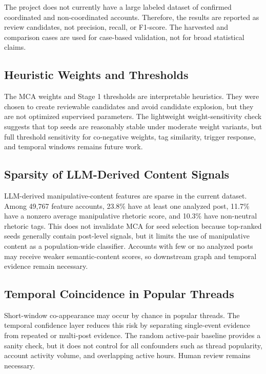 \documentclass[conference]{IEEEtran}
\begin{document}
The project does not currently have a large labeled dataset of confirmed
coordinated and non-coordinated accounts. Therefore, the results are reported
as review candidates, not precision, recall, or F1-score. The harvested and
comparison cases are used for case-based validation, not for broad statistical
claims.

\subsection{Heuristic Weights and Thresholds}

The MCA weights and Stage 1 thresholds are interpretable heuristics. They were
chosen to create reviewable candidates and avoid candidate explosion, but they
are not optimized supervised parameters. The lightweight weight-sensitivity
check suggests that top seeds are reasonably stable under moderate weight
variants, but full threshold sensitivity for co-negative weights, tag
similarity, trigger response, and temporal windows remains future work.

\subsection{Sparsity of LLM-Derived Content Signals}

LLM-derived manipulative-content features are sparse in the current dataset.
Among 49,767 feature accounts, 23.8\% have at least one analyzed post, 11.7\%
have a nonzero average manipulative rhetoric score, and 10.3\% have non-neutral
rhetoric tags. This does not invalidate MCA for seed selection because
top-ranked seeds generally contain post-level signals, but it limits the use
of manipulative content as a population-wide classifier. Accounts with few or
no analyzed posts may receive weaker semantic-content scores, so downstream
graph and temporal evidence remain necessary.

\subsection{Temporal Coincidence in Popular Threads}

Short-window co-appearance may occur by chance in popular threads. The
temporal confidence layer reduces this risk by separating single-event
evidence from repeated or multi-post evidence. The random active-pair baseline
provides a sanity check, but it does not control for all confounders such as
thread popularity, account activity volume, and overlapping active hours.
Human review remains necessary.
\end{document}
